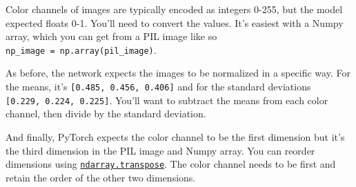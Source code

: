 \documentclass[11pt]{article}
\begin{document}
Color channels of images are typically encoded as integers 0-255, but
the model expected floats 0-1. You'll need to convert the values. It's
easiest with a Numpy array, which you can get from a PIL image like so
\texttt{np\_image\ =\ np.array(pil\_image)}.

As before, the network expects the images to be normalized in a specific
way. For the means, it's \texttt{{[}0.485,\ 0.456,\ 0.406{]}} and for
the standard deviations \texttt{{[}0.229,\ 0.224,\ 0.225{]}}. You'll
want to subtract the means from each color channel, then divide by the
standard deviation.

And finally, PyTorch expects the color channel to be the first dimension
but it's the third dimension in the PIL image and Numpy array. You can
reorder dimensions using
\href{https://docs.scipy.org/doc/numpy-1.13.0/reference/generated/numpy.ndarray.transpose.html}{\texttt{ndarray.transpose}}.
The color channel needs to be first and retain the order of the other
two dimensions.
\end{document}
